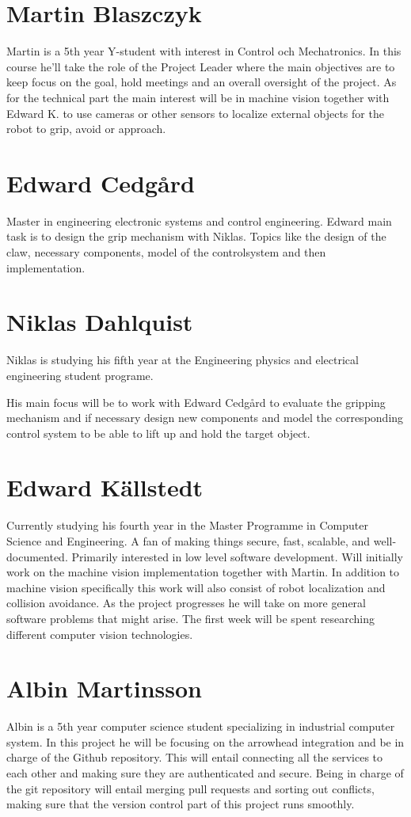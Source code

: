 
\section*{Martin Blaszczyk}
Martin is a 5th year Y-student with interest in Control och Mechatronics. 
In this course he'll take the role of the Project Leader where the main objectives
are to keep focus on the goal, hold meetings and an overall oversight of the project. 
As for the technical part the main interest will be in machine vision together with
Edward K. to use cameras or other sensors to localize external objects for the 
robot to grip, avoid or approach. 

\section*{Edward Cedgård}
Master in engineering electronic systems and control engineering.
Edward main task is to design the grip mechanism with Niklas. Topics like
the design of the claw, necessary components, model of the controlsystem and then implementation. 

\section*{Niklas Dahlquist}
Niklas is studying his fifth year at the Engineering physics and electrical engineering student programe.

His main focus will be to work with Edward Cedgård to evaluate the gripping mechanism and if necessary design new components and model the corresponding control system to be able to lift up and hold the target object.
\section*{Edward Källstedt}
Currently studying his fourth year in the Master Programme in Computer Science and Engineering.
A fan of making things secure, fast, scalable, and well-documented. Primarily interested in
low level software development. Will initially work on the machine vision implementation 
together with Martin. In addition to machine vision specifically this work will also consist
of robot localization and collision avoidance. As the project progresses he will take on more
general software problems that might arise. The first week will be spent researching different
computer vision technologies.

\section*{Albin Martinsson}
Albin is a 5th year computer science student specializing in industrial computer system. In this project he will be focusing on the 
arrowhead integration and be in charge of the Github repository. This will entail connecting all the services to each other and
making sure they are authenticated and secure. Being in charge of the git repository will entail merging pull requests and sorting
out conflicts, making sure that the version control part of this project runs smoothly.

